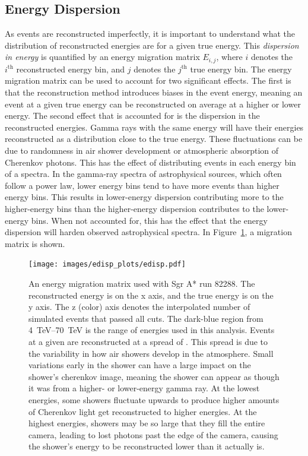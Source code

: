   \FloatBarrier

  \subsection{Energy Dispersion}\label{subsec:edisp}
    As events are reconstructed imperfectly, it is important to understand what the distribution of reconstructed energies are for a given true energy.
    This \textit{dispersion in energy} is quantified by an energy migration matrix $E_{i,j}$, where $i$ denotes the $i^{\text{th}}$ reconstructed energy bin, and $j$ denotes the $j^{\text{th}}$ true energy bin.
    The energy migration matrix can be used to account for two significant effects.
    The first is that the reconstruction method introduces biases in the event energy, meaning an event at a given true energy can be reconstructed on average at a higher or lower energy.
    The second effect that is accounted for is the dispersion in the reconstructed energies.
    Gamma rays with the same energy will have their energies reconstructed as a distribution close to the true energy.
    These fluctuations can be due to randomness in air shower development or atmospheric absorption of Cherenkov photons.
    This has the effect of distributing events in each energy bin of a spectra.
    In the gamma-ray spectra of astrophysical sources, which often follow a power law, lower energy bins tend to have more events than higher energy bins.
    This results in lower-energy dispersion contributing more to the higher-energy bins than the higher-energy dispersion contributes to the lower-energy bins.
    When not accounted for, this has the effect that the energy dispersion will harden observed astrophysical spectra.
    In Figure~\ref{fig:migmatrix}, a migration matrix is shown.

    \begin{figure}[!th]
      \centering
      \texttt{[image: images/edisp\_plots/edisp.pdf]}
      \caption[Energy Migration Matrix]{
        An energy migration matrix used with Sgr A* run 82288.
        The reconstructed energy is on the x axis, and the true energy is on the y axis.
        The z (color) axis denotes the interpolated number of simulated events that passed all cuts.
        The dark-blue region from \SIrange{4}{70}{TeV} \EReco{} is the range of energies used in this analysis.
        Events at a given \ETrue{} are reconstructed at a spread of \EReco{}.
        This spread is due to the variability in how air showers develop in the atmosphere.
        Small variations early in the shower can have a large impact on the shower's cherenkov image, meaning the shower can appear as though it was from a higher- or lower-energy gamma ray.
        At the lowest \ETrue{} energies, some showers fluctuate upwards to produce higher amounts of Cherenkov light get reconstructed to higher \EReco{} energies.
        At the highest \ETrue{} energies, showers may be so large that they fill the entire camera, leading to lost photons past the edge of the camera, causing the shower's energy to be reconstructed lower than it actually is.
      }
      \label{fig:migmatrix}
    \end{figure}
  
